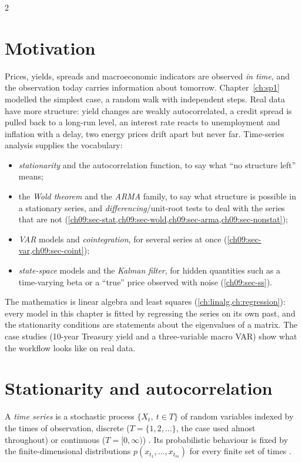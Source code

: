 \begin{paracol}{2}
\section*{Motivation}
Prices, yields, spreads and macroeconomic indicators are observed \emph{in time}, and the observation
today carries information about tomorrow. Chapter~\ref{ch:sp1} modelled the simplest case, a random walk
with independent steps. Real data have more structure: yield changes are weakly autocorrelated, a credit
spread is pulled back to a long-run level, an interest rate reacts to unemployment and inflation with a
delay, two energy prices drift apart but never far. Time-series analysis supplies the vocabulary:
\begin{itemize}
  \item \emph{stationarity} and the autocorrelation function, to say what ``no structure left'' means;
  \item the \emph{Wold theorem} and the \emph{ARMA} family, to say what structure is possible in
        a stationary series, and \emph{differencing}/unit-root tests to deal with the series that are not
        (\cref{ch09:sec-stat,ch09:sec-wold,ch09:sec-arma,ch09:sec-nonstat});
  \item \emph{VAR} models and \emph{cointegration}, for several series at once
        (\cref{ch09:sec-var,ch09:sec-coint});
  \item \emph{state-space} models and the \emph{Kalman filter}, for hidden quantities such as a time-varying
        beta or a ``true'' price observed with noise (\cref{ch09:sec-ss}).
\end{itemize}
The mathematics is linear algebra and least squares (\cref{ch:linalg,ch:regression}): every model in
this chapter is fitted by regressing the series on its own past, and the stationarity conditions are
statements about the eigenvalues of a matrix. The case studies (10-year Treasury yield and a
three-variable macro VAR) show what the workflow looks like on real data.

\section{Stationarity and autocorrelation}\label{ch09:sec-stat}

A \emph{time series} is a stochastic process $\{X_t,\ t\in T\}$ of random variables indexed by the times
of observation, discrete ($T=\{1,2,\dots\}$, the case used almost throughout) or continuous
($T=[0,\infty)$) . Its probabilistic behaviour is fixed by the finite-dimensional
distributions $p(x_{t_1},\dots,x_{t_m})$ for every finite set of times .


\end{paracol}
